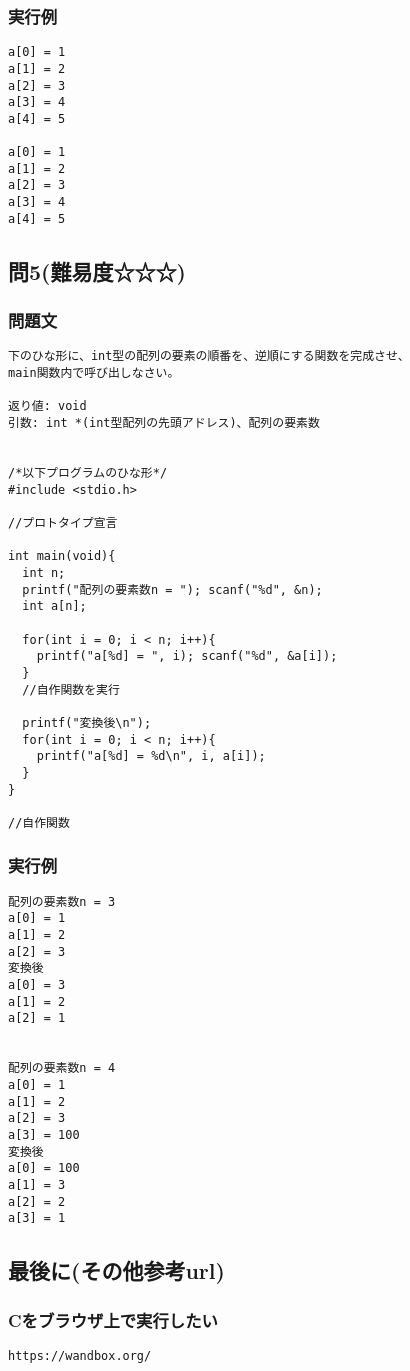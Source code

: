 \subsubsection{実行例}
\begin{verbatim}
a[0] = 1
a[1] = 2
a[2] = 3
a[3] = 4
a[4] = 5

a[0] = 1
a[1] = 2
a[2] = 3
a[3] = 4
a[4] = 5
\end{verbatim}

\subsection{問5(難易度☆☆☆)}
\subsubsection{問題文}
\begin{verbatim}
下のひな形に、int型の配列の要素の順番を、逆順にする関数を完成させ、
main関数内で呼び出しなさい。

返り値: void
引数: int *(int型配列の先頭アドレス)、配列の要素数


/*以下プログラムのひな形*/
#include <stdio.h>

//プロトタイプ宣言

int main(void){
  int n;
  printf("配列の要素数n = "); scanf("%d", &n);
  int a[n];

  for(int i = 0; i < n; i++){
    printf("a[%d] = ", i); scanf("%d", &a[i]);
  }
  //自作関数を実行

  printf("変換後\n");
  for(int i = 0; i < n; i++){
    printf("a[%d] = %d\n", i, a[i]);
  }
}

//自作関数
\end{verbatim}

\subsubsection{実行例}
\begin{verbatim}
配列の要素数n = 3
a[0] = 1
a[1] = 2
a[2] = 3
変換後
a[0] = 3
a[1] = 2
a[2] = 1


配列の要素数n = 4
a[0] = 1
a[1] = 2
a[2] = 3
a[3] = 100
変換後
a[0] = 100
a[1] = 3
a[2] = 2
a[3] = 1
\end{verbatim}

\subsection{最後に(その他参考url)}
\subsubsection{Cをブラウザ上で実行したい}
\begin{verbatim}
https://wandbox.org/
\end{verbatim}
